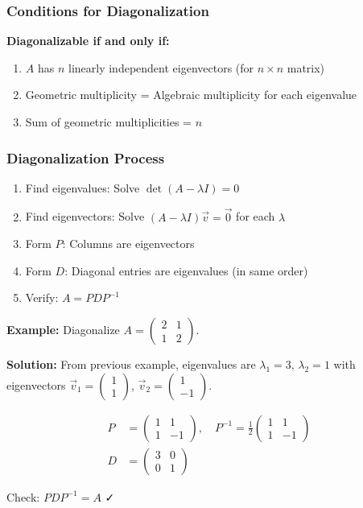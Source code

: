 \documentclass[12pt,a4paper]{article}
\begin{document}
\subsubsection{Conditions for Diagonalization}
\begin{importantbox}
\textbf{Diagonalizable if and only if:}
\begin{enumerate}
    \item $A$ has $n$ linearly independent eigenvectors (for $n \times n$ matrix)
    \item Geometric multiplicity = Algebraic multiplicity for each eigenvalue
    \item Sum of geometric multiplicities = $n$
\end{enumerate}
\end{importantbox}

\subsubsection{Diagonalization Process}
\begin{enumerate}
    \item Find eigenvalues: Solve $\det(A - \lambda I) = 0$
    \item Find eigenvectors: Solve $(A - \lambda I)\vec{v} = \vec{0}$ for each $\lambda$
    \item Form $P$: Columns are eigenvectors
    \item Form $D$: Diagonal entries are eigenvalues (in same order)
    \item Verify: $A = PDP^{-1}$
\end{enumerate}

\begin{examplebox}
\textbf{Example:} Diagonalize $A = \begin{pmatrix} 2 & 1 \\ 1 & 2 \end{pmatrix}$.

\textbf{Solution:} From previous example, eigenvalues are $\lambda_1 = 3$, $\lambda_2 = 1$ with eigenvectors $\vec{v}_1 = \begin{pmatrix} 1 \\ 1 \end{pmatrix}$, $\vec{v}_2 = \begin{pmatrix} 1 \\ -1 \end{pmatrix}$.

\begin{align}
P &= \begin{pmatrix} 1 & 1 \\ 1 & -1 \end{pmatrix}, \quad P^{-1} = \frac{1}{2}\begin{pmatrix} 1 & 1 \\ 1 & -1 \end{pmatrix} \\
D &= \begin{pmatrix} 3 & 0 \\ 0 & 1 \end{pmatrix}
\end{align}

Check: $PDP^{-1} = A$ ✓
\end{examplebox}
\end{document}
